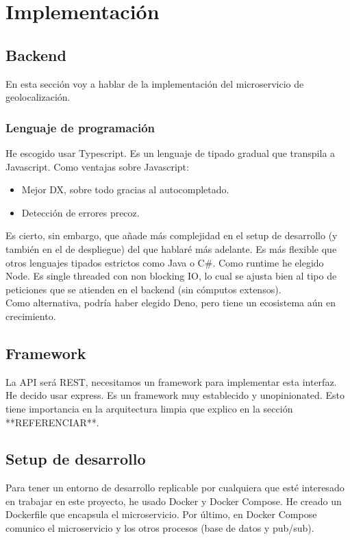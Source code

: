 \chapter{Implementación}

\section{Backend}
En esta sección voy a hablar de la implementación del microservicio de geolocalización.
\subsection{Lenguaje de programación}
He escogido usar Typescript. Es un lenguaje de tipado gradual que transpila a Javascript.
Como ventajas sobre Javascript:
\begin{itemize}
	\item Mejor DX, sobre todo gracias al autocompletado.
	\item Detección de errores precoz.
\end{itemize}
Es cierto, sin embargo, que añade más complejidad en el setup de desarrollo (y también en el de despliegue) del que hablaré más adelante.
Es más flexible que otros lenguajes tipados estrictos como Java o C\#.
Como runtime he elegido Node. Es single threaded con non blocking IO, lo cual se ajusta bien al tipo 
de peticiones que se atienden en el backend (sin cómputos extensos).  \\
Como alternativa, podría haber elegido Deno, pero tiene un ecosistema aún en crecimiento.

\section{Framework}
La API será REST, necesitamos un framework para implementar esta interfaz. \\

He decido usar express. Es un framework muy establecido y unopinionated. Esto tiene importancia en la 
arquitectura limpia que explico en la sección **REFERENCIAR**. 

\section{Setup de desarrollo}

Para tener un entorno de desarrollo replicable por cualquiera que esté interesado en trabajar en este proyecto, 
he usado Docker y Docker Compose. He creado un Dockerfile que encapsula el microservicio. 
Por último, en Docker Compose comunico el microservicio y los otros procesos (base de datos y pub/sub).


